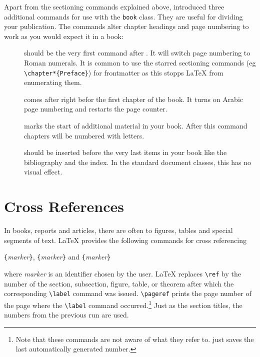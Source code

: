 Apart from the sectioning commands explained above, \LaTeXe{}
introduced three additional commands for use with the \verb|book| class. 
They are useful for dividing your publication. The commands alter
chapter headings and page numbering to work as you would expect it in
a book:
\begin{description}
\item[] should be the very first command after
  \verb||. It will switch page numbering to Roman
    numerals. It is common to use the starred sectioning commands (eg
    \verb|\chapter*{Preface}|) for
    frontmatter as this stopps \LaTeX{} from
    enumerating them.
\item[] comes after right befor the first chapter of
  the book. It turns on Arabic page numbering and restarts the page
  counter.
\item[] marks the start of additional material in your
  book. After this command chapters will be numbered with letters.
\item[] should be inserted before the very last items
  in your book like the bibliography and the index. In the standard
  document classes, this has no visual effect.
\end{description}


\section{Cross References}

In books, reports and articles, there are often 
 to figures, tables and special segments of text.
\LaTeX{} provides the following commands for cross referencing
\begin{lscommand}
\verb|{|\emph{marker}\verb|}|, \verb|{|\emph{marker}\verb|}| 
and \verb|{|\emph{marker}\verb|}|
\end{lscommand}
\noindent where \emph{marker} is an identifier chosen by the user. \LaTeX{}
replaces \verb|\ref| by the number of the section, subsection, figure,
table, or theorem after which the corresponding \verb|\label| command
was issued. \verb|\pageref| prints the page number of the
page where the \verb|\label| command occurred.\footnote{Note that these commands
  are not aware of what they refer to.  just saves the last
  automatically generated number.} Just as the section titles, the
numbers from the previous run are used.


